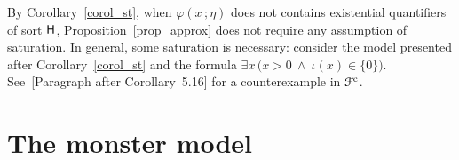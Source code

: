 \documentclass{amsproc}
\begin{document}

\def\ceq#1#2#3{\parbox[t]{20ex}{$\displaystyle #1$}\parbox[t]{6ex}{\hfil $#2$}{$\displaystyle #3$}}

\begin{remark}\label{remk_approx_EH_free}
  By Corollary~\ref{corol_st}, when $\varphi(x\,;\eta)$ does not contains existential quantifiers of sort ${\sf H}$, Proposition~\ref{prop_approx} does not require any assumption of saturation.
  In general, some saturation is necessary: consider the model presented after Corollary~\ref{corol_st} and the formula $\exists x\,\big(x>0\ \wedge\ \iota(x)\in\{0\}\big)$.
  See~[Paragraph after Corollary~5.16]\cite{HI} for a counterexample in ${\EuScript F}^{\rm c}$.
\end{remark}

  
\section{The monster model}\label{monster}

\def\ceq#1#2#3{\parbox[t]{18ex}{$\displaystyle #1$}\parbox{6ex}{\hfil $#2$}{$\displaystyle #3$}}
\end{document}
